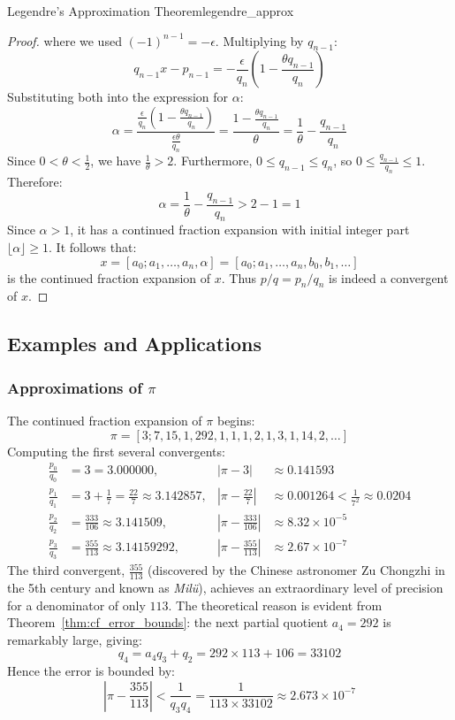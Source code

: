 \documentclass[a4paper]{article}
\begin{document}
\begin{mytheorem}{Legendre's Approximation Theorem}{legendre_approx}
\begin{proof}
    where we used $(-1)^{n-1} = -\epsilon$.
    Multiplying by $q_{n-1}$:
    \[
      q_{n-1} x - p_{n-1} = -\frac{\epsilon}{q_n} \left( 1 - \frac{\theta q_{n-1}}{q_n} \right)
    \]
    Substituting both into the expression for $\alpha$:
    \[
      \alpha = \frac{\frac{\epsilon}{q_n} \left( 1 - \frac{\theta q_{n-1}}{q_n} \right)}{\frac{\epsilon \theta}{q_n}} = \frac{1 - \frac{\theta q_{n-1}}{q_n}}{\theta} = \frac{1}{\theta} - \frac{q_{n-1}}{q_n}
    \]
    Since $0 < \theta < \frac{1}{2}$, we have $\frac{1}{\theta} > 2$.
    Furthermore, $0 \le q_{n-1} \le q_n$, so $0 \le \frac{q_{n-1}}{q_n} \le 1$.
    Therefore:
    \[
      \alpha = \frac{1}{\theta} - \frac{q_{n-1}}{q_n} > 2 - 1 = 1
    \]
    Since $\alpha > 1$, it has a continued fraction expansion with initial integer part $\lfloor\alpha\rfloor \ge 1$.
    It follows that:
    \[
      x = [a_0; a_1, \dots, a_n, \alpha] = [a_0; a_1, \dots, a_n, b_0, b_1, \dots]
    \]
    is the continued fraction expansion of $x$.
    Thus $p/q = p_n/q_n$ is indeed a convergent of $x$.
  \end{proof}
\end{mytheorem}

\subsection{Examples and Applications}
\subsubsection{Approximations of \texorpdfstring{$\pi$}{pi}}
The continued fraction expansion of $\pi$ begins:
\[
  \pi = [3; 7, 15, 1, 292, 1, 1, 1, 2, 1, 3, 1, 14, 2, \dots]
\]
Computing the first several convergents:
\begin{align*}
  \frac{p_0}{q_0} & = 3 = 3.000000, & \left|\pi - 3\right| & \approx 0.141593 \\
  \frac{p_1}{q_1} & = 3 + \frac{1}{7} = \frac{22}{7} \approx 3.142857, & \left|\pi - \frac{22}{7}\right| & \approx 0.001264 < \frac{1}{7^2} \approx 0.0204 \\
  \frac{p_2}{q_2} & = \frac{333}{106} \approx 3.141509, & \left|\pi - \frac{333}{106}\right| & \approx 8.32 \times 10^{-5} \\
  \frac{p_3}{q_3} & = \frac{355}{113} \approx 3.14159292, & \left|\pi - \frac{355}{113}\right| & \approx 2.67 \times 10^{-7}
\end{align*}
The third convergent, $\frac{355}{113}$ (discovered by the Chinese astronomer Zu Chongzhi in the 5th century and known as \emph{Milü}), achieves an extraordinary level of precision for a denominator of only $113$.
The theoretical reason is evident from Theorem~\ref{thm:cf_error_bounds}: the next partial quotient $a_4 = 292$ is remarkably large, giving:
\[
  q_4 = a_4 q_3 + q_2 = 292 \times 113 + 106 = 33102
\]
Hence the error is bounded by:
\[
  \left|\pi - \frac{355}{113}\right| < \frac{1}{q_3 q_4} = \frac{1}{113 \times 33102} \approx 2.673 \times 10^{-7}
\]
\end{document}
